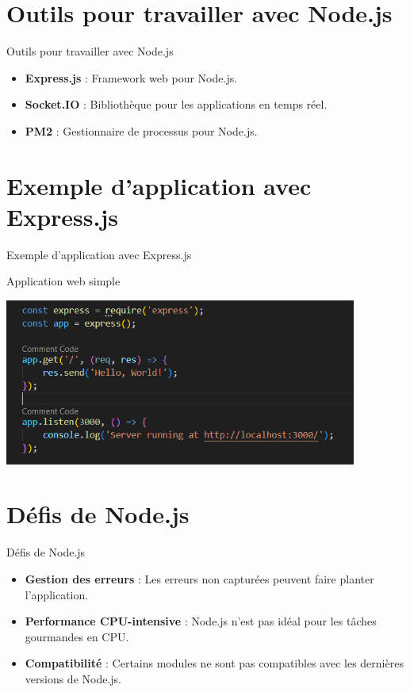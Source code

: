 \documentclass{clbeamer2024}
\begin{document}
	
	\section{Outils pour travailler avec Node.js}
	\begin{frame}{Outils pour travailler avec Node.js}
		\begin{itemize}
			\item \textbf{Express.js} : Framework web pour Node.js.
			\item \textbf{Socket.IO} : Bibliothèque pour les applications en temps réel.
			\item \textbf{PM2} : Gestionnaire de processus pour Node.js.
		\end{itemize}
	\end{frame}
	
	\section{Exemple d'application avec Express.js}
	\begin{frame}{Exemple d'application avec Express.js}
		\begin{exampleblock}{Application web simple}
				\begin{center}
				\includegraphics[width=0.87\textwidth]{images/code2.png}
			\end{center}
		
		\end{exampleblock}
	\end{frame}
	
	
	\section{Défis de Node.js}
	\begin{frame}{Défis de Node.js}
		\begin{itemize}
			\item \textbf{Gestion des erreurs} : Les erreurs non capturées peuvent faire planter l'application.
			\item \textbf{Performance CPU-intensive} : Node.js n'est pas idéal pour les tâches gourmandes en CPU.
			\item \textbf{Compatibilité} : Certains modules ne sont pas compatibles avec les dernières versions de Node.js.
		\end{itemize}
	\end{frame}
	
\end{document}
